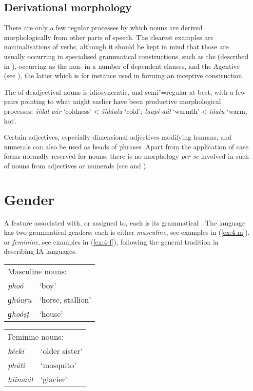 \subsection{Derivational morphology}
\label{subsec:4-2-2}

There are only a few regular processes by which nouns are derived morphologically from other parts of speech. The clearest examples are nominalisations of verbs, although it should be kept in mind that those are usually occurring in specialised grammatical constructions, such as the  (described in ), occurring as the non-  in a number of dependent clauses, and the Agentive  (see ), the latter which is for instance used in forming an inceptive construction.


The  of deadjectival nouns is idiosyncratic, and semi"=regular at best, with a few pairs pointing to what might earlier have been productive morphological processes: \textit{šidal-aár} `coldness' < \textit{šidáalu} `cold'; \textit{taapi-aál} `warmth' < \textit{táatu} `warm, hot'.     


Certain adjectives, especially dimensional adjectives modifying humans, and numerals can also be used as heads of  phrases. Apart from the application of case forms normally reserved for nouns, there is no morphology \textit{per se} involved in such  of nouns from adjectives or numerals (see  and ). 


\section{Gender}
\label{sec:4-3}

A feature associated with, or assigned to, each  is its grammatical . The language has two grammatical genders; each  is either \textit{masculine}, see examples in (\ref{ex:4-m}), or \textit{feminine}, see examples in (\ref{ex:4-f}), following the general tradition in describing IA languages. 


\begin{exe}
\extab
\label{ex:4-m}
\begin{tabularx}{\textwidth}{ l l }
\multicolumn{2}{l}{Masculine nouns:}\\
\textit{phoó} &
`boy' \\
\textit{ɡhúuṛu} &
`horse, stallion'\\
\textit{ɡhoóṣṭ} &
`house'\\
\end{tabularx}

\extab
\label{ex:4-f}
\begin{tabularx}{\textwidth}{ l l }
\multicolumn{2}{l}{Feminine nouns:}\\
\textit{kéeki} &
`older sister'\\
\textit{phúti} &
`mosquito'\\
\textit{hiimaál} &
`glacier'\\
\end{tabularx}
\end{exe}


